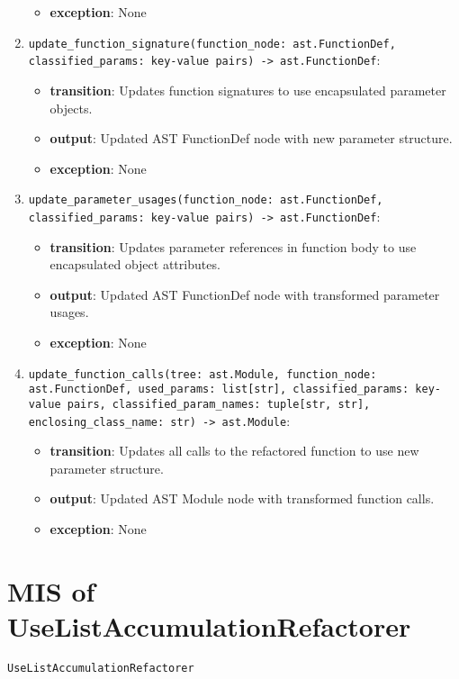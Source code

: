 \documentclass[12pt, titlepage]{article}
\begin{document}
\begin{enumerate}
\begin{itemize}
    \item \textbf{exception}: None
  \end{itemize}
  \item \texttt{update\_function\_signature(function\_node: ast.FunctionDef, classified\_params: key-value pairs) -> ast.FunctionDef}:
  \begin{itemize}
    \item \textbf{transition}: Updates function signatures to use encapsulated parameter objects.
    \item \textbf{output}: Updated AST FunctionDef node with new parameter structure.
    \item \textbf{exception}: None
  \end{itemize}
  \item \texttt{update\_parameter\_usages(function\_node: ast.FunctionDef, classified\_params: key-value pairs) -> ast.FunctionDef}: 
  \begin{itemize}
    \item \textbf{transition}: Updates parameter references in function body to use encapsulated object attributes.
    \item \textbf{output}: Updated AST FunctionDef node with transformed parameter usages.
    \item \textbf{exception}: None
  \end{itemize}
  \item \texttt{update\_function\_calls(tree: ast.Module, function\_node: ast.FunctionDef, used\_params: list[str], classified\_params: key-value pairs, classified\_param\_names: tuple[str, str], enclosing\_class\_name: str) -> ast.Module}: 
  \begin{itemize}
    \item \textbf{transition}: Updates all calls to the refactored function to use new parameter structure.
    \item \textbf{output}: Updated AST Module node with transformed function calls.
    \item \textbf{exception}: None
  \end{itemize}
  \end{enumerate}

  \section{MIS of UseListAccumulationRefactorer} \label{mis:ListAccum}

  \texttt{UseListAccumulationRefactorer}
  
\end{document}
